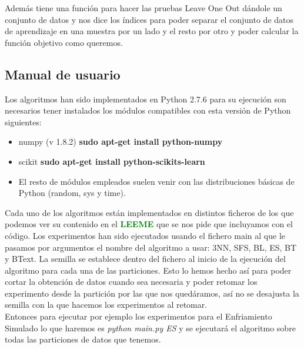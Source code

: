 \documentclass[10pt,a4paper]{article}
\begin{document}
Además tiene una función para hacer las pruebas Leave One Out dándole un conjunto de datos y nos dice los índices para poder separar el conjunto de datos de aprendizaje en una muestra por un lado y el resto por otro y poder calcular la función objetivo como queremos.\\

\subsection{\color[rgb]{0.0,0.0,0.51}Manual de usuario}
Los algoritmos han sido implementados en Python 2.7.6 para su ejecución son necesarios tener instalados los módulos compatibles con esta versión de Python siguientes:\\

\begin{itemize}
\item numpy (v 1.8.2) \textbf{sudo apt-get install python-numpy}
\item scikit \textbf{sudo apt-get install python-scikits-learn}
\item El resto de módulos empleados suelen venir con las distribuciones básicas de Python (random, sys y time).
\end{itemize}

Cada uno de los algoritmos están implementados en distintos ficheros de los que podemos ver su contenido en el \textbf{\textcolor{green}{LEEME}} que se nos pide que incluyamos con el código. Los experimentos han sido ejecutados usando el fichero main al que le pasamos por argumentos el nombre del algoritmo a usar: 3NN, SFS, BL, ES, BT y BText. La semilla se establece dentro del fichero al inicio de la ejecución del algoritmo para cada una de las particiones. Esto lo hemos hecho así para poder cortar la obtención de datos cuando sea necesaria y poder retomar los experimento desde la partición por las que nos quedáramos, así no se desajusta la semilla con la que hacemos los experimentos al retomar.\\

Entonces para ejecutar por ejemplo los experimentos para el Enfriamiento Simulado lo que haremos es \textit{python main.py ES} y se ejecutará el algoritmo sobre todas las particiones de datos que tenemos.\\
\end{document}

